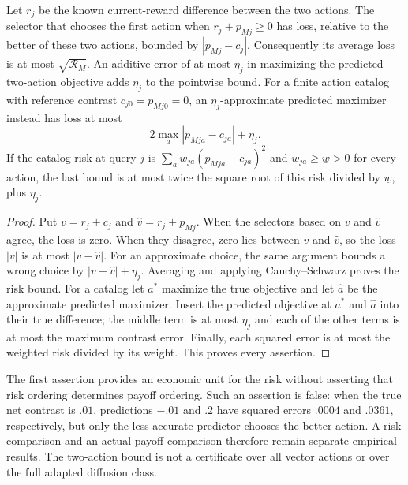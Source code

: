 \begin{proposition}\label{prop:r17-decisions}
Let $r_j$ be the known current-reward difference between the two actions.
The selector that chooses the first action when $r_j+p_{Mj}\geq0$ has loss,
relative to the better of these two actions, bounded by $|p_{Mj}-c_j|$.
Consequently its average loss is at most $\sqrt{\mathcal R_M}$. An additive
error of at most $\eta_j$ in maximizing the predicted two-action objective adds
$\eta_j$ to the pointwise bound. For a finite action catalog with reference
contrast $c_{j0}=p_{Mj0}=0$, an $\eta_j$-approximate predicted maximizer instead
has loss at most
\[
 2\max_a|p_{Mja}-c_{ja}|+\eta_j.
\]
If the catalog risk at query $j$ is $\sum_a w_{ja}(p_{Mja}-c_{ja})^2$ and
$w_{ja}\geq\underline w>0$ for every action, the last bound is at most twice
the square root of this risk divided by $\underline w$, plus $\eta_j$.
\end{proposition}
\begin{proof}
Put $v=r_j+c_j$ and $\widehat v=r_j+p_{Mj}$. When the selectors based on $v$
and $\widehat v$ agree, the loss is zero. When they disagree, zero lies between
$v$ and $\widehat v$, so the loss $|v|$ is at most $|v-\widehat v|$.
For an approximate choice, the same argument bounds a wrong choice by
$|v-\widehat v|+\eta_j$. Averaging and applying Cauchy--Schwarz proves the
risk bound. For a catalog let $a^*$ maximize the true objective and let
$\widehat a$ be the approximate predicted maximizer. Insert the predicted
objective at $a^*$ and $\widehat a$ into their true difference; the middle
term is at most $\eta_j$ and each of the other terms is at most the maximum
contrast error. Finally, each squared error is at most the weighted risk
divided by its weight. This proves every assertion.
\end{proof}

The first assertion provides an economic unit for the risk without asserting
that risk ordering determines payoff ordering. Such an assertion is false:
when the true net contrast is $.01$, predictions $-.01$ and $.2$ have squared
errors $.0004$ and $.0361$, respectively, but only the less accurate predictor
chooses the better action. A risk comparison and an actual payoff comparison
therefore remain separate empirical results. The two-action bound is not a
certificate over all vector actions or over the full adapted diffusion class.

